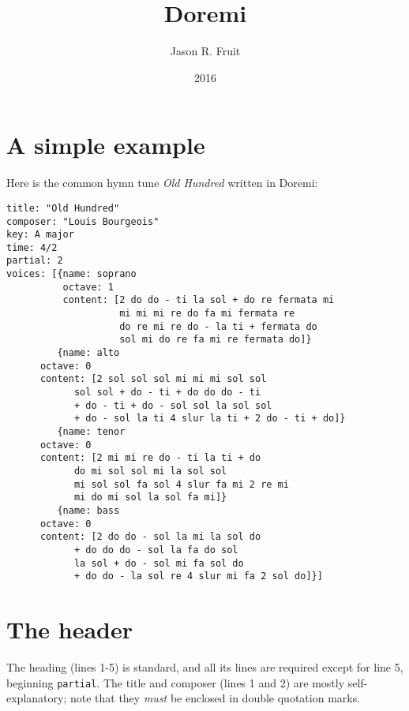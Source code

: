\documentclass{article}
\title{Doremi}
\author{Jason R. Fruit}
\date{2016}
\begin{document}
\maketitle


\tableofcontents

\section{A simple example}

Here is the common hymn tune \textit{Old Hundred} written in Doremi:

\linenumbers
\begin{verbatim}
title: "Old Hundred"
composer: "Louis Bourgeois"
key: A major
time: 4/2
partial: 2
voices: [{name: soprano
          octave: 1
          content: [2 do do - ti la sol + do re fermata mi
                    mi mi mi re do fa mi fermata re
                    do re mi re do - la ti + fermata do
                    sol mi do re fa mi re fermata do]}
         {name: alto
	  octave: 0
	  content: [2 sol sol sol mi mi mi sol sol
	  	    sol sol + do - ti + do do do - ti
		    + do - ti + do - sol sol la sol sol
		    + do - sol la ti 4 slur la ti + 2 do - ti + do]}
         {name: tenor
	  octave: 0
	  content: [2 mi mi re do - ti la ti + do
	  	    do mi sol sol mi la sol sol
		    mi sol sol fa sol 4 slur fa mi 2 re mi
		    mi do mi sol la sol fa mi]}
         {name: bass
	  octave: 0
	  content: [2 do do - sol la mi la sol do
	  	    + do do do - sol la fa do sol
	  	    la sol + do - sol mi fa sol do
	  	    + do do - la sol re 4 slur mi fa 2 sol do]}]
\end{verbatim}
\nolinenumbers

\section{The header}

The heading (lines 1-5) is standard, and all its lines are required
except for line 5, beginning \texttt{partial}.  The title and composer
(lines 1 and 2) are mostly self-explanatory; note that they
\textit{must} be enclosed in double quotation marks.
\end{document}

